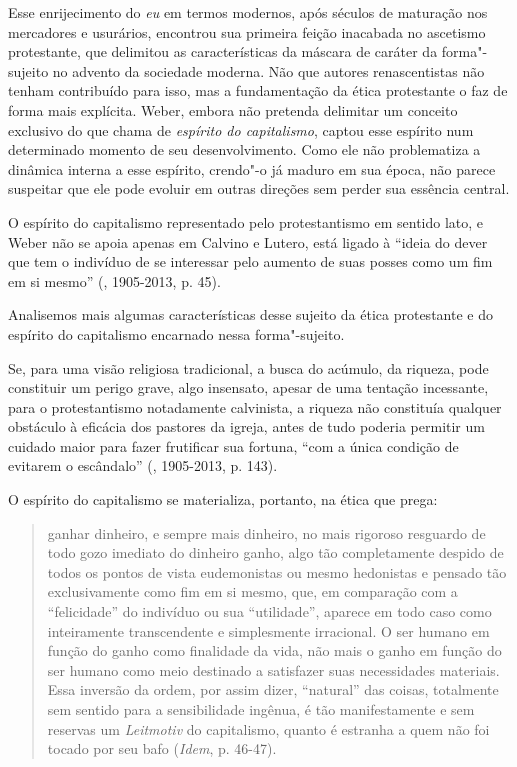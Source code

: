 Esse enrijecimento do \emph{eu} em termos modernos, após séculos de
maturação nos mercadores e usurários, encontrou sua primeira feição
inacabada no ascetismo protestante, que delimitou as características da
máscara de caráter da forma"-sujeito no advento da sociedade moderna. Não
que autores renascentistas não tenham contribuído para isso, mas a
fundamentação da ética protestante o faz de forma mais explícita. Weber,
embora não pretenda delimitar um conceito exclusivo do que chama de
\emph{espírito do capitalismo}, captou esse espírito num determinado
momento de seu desenvolvimento. Como ele não problematiza a dinâmica
interna a esse espírito, crendo"-o já maduro em sua época, não parece
suspeitar que ele pode evoluir em outras direções sem perder sua
essência central.

O espírito do capitalismo representado pelo protestantismo em sentido
lato, e Weber não se apoia apenas em Calvino e Lutero, está ligado à
``ideia do dever que tem o indivíduo de se interessar pelo aumento de
suas posses como um fim em si mesmo'' (, 1905-2013, p. 45).

Analisemos mais algumas características desse sujeito da ética
protestante e do espírito do capitalismo encarnado nessa forma"-sujeito.

Se, para uma visão religiosa tradicional, a busca do acúmulo, da
riqueza, pode constituir um perigo grave, algo insensato, apesar de uma
tentação incessante, para o protestantismo notadamente calvinista, a
riqueza não constituía qualquer obstáculo à eficácia dos pastores da
igreja, antes de tudo poderia permitir um cuidado maior para fazer
frutificar sua fortuna, ``com a única condição de evitarem o
escândalo'' (, 1905-2013, p. 143).

O espírito do capitalismo se materializa, portanto, na ética que prega:

\begin{quote}
ganhar dinheiro, e sempre mais dinheiro, no mais rigoroso resguardo de
todo gozo imediato do dinheiro ganho, algo tão completamente despido de
todos os pontos de vista eudemonistas ou mesmo hedonistas e pensado tão
exclusivamente como fim em si mesmo, que, em comparação com a
``felicidade'' do indivíduo ou sua ``utilidade'', aparece em todo caso
como inteiramente transcendente e simplesmente irracional. O ser humano
em função do ganho como finalidade da vida, não mais o ganho em função
do ser humano como meio destinado a satisfazer suas necessidades
materiais. Essa inversão da ordem, por assim dizer, ``natural'' das
coisas, totalmente sem sentido para a sensibilidade ingênua, é tão
manifestamente e sem reservas um \emph{Leitmotiv} do capitalismo, quanto
é estranha a quem não foi tocado por seu bafo (\emph{Idem}, p. 46-47).
\end{quote}

